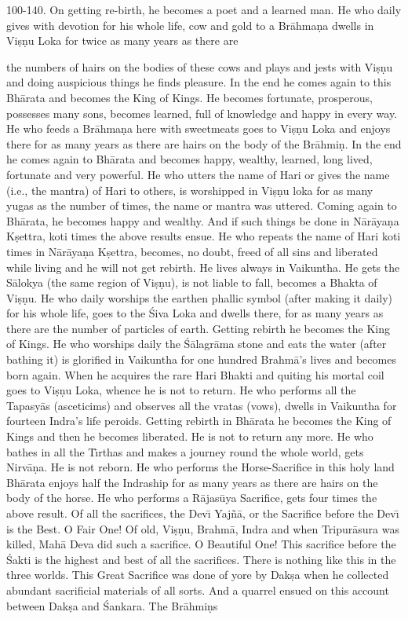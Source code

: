 100-140. On getting re-birth, he becomes a poet and a learned man. He who daily gives with devotion for his whole life, cow and gold to a Br\=ahma\d{n}a dwells in Vi\d{s}\d{n}u Loka for twice as many years as there are

the numbers of hairs on the bodies of these cows and plays and jests with Vi\d{s}\d{n}u and doing auspicious things he finds pleasure. In the end he comes again to this Bh\=arata and becomes the King of Kings. He becomes fortunate, prosperous, possesses many sons, becomes learned, full of knowledge and happy in every way. He who feeds a Br\=ahma\d{n}a here with sweetmeats goes to Vi\d{s}\d{n}u Loka and enjoys there for as many years as there are hairs on the body of the Br\=ahmi\d{n}. In the end he comes again to Bh\=arata and becomes happy, wealthy, learned, long lived, fortunate and very powerful. He who utters the name of Hari or gives the name (i.e., the mantra) of Hari to others, is worshipped in Vi\d{s}\d{n}u loka for as many yugas as the number of times, the name or mantra was uttered. Coming again to Bh\=arata, he becomes happy and wealthy. And if such things be done in N\=ar\=aya\d{n}a K\d{s}ettra, koti times the above results ensue. He who repeats the name of Hari koti times in N\=ar\=aya\d{n}a K\d{s}ettra, becomes, no doubt, freed of all sins and liberated while living and he will not get rebirth. He lives always in Vaikuntha. He gets the S\=alokya (the same region of Vi\d{s}\d{n}u), is not liable to fall, becomes a Bhakta of Vi\d{s}\d{n}u. He who daily worships the earthen phallic symbol (after making it daily) for his whole life, goes to the \'Siva Loka and dwells there, for as many years as there are the number of particles of earth. Getting rebirth he becomes the King of Kings. He who worships daily the \'S\=alagr\=ama stone and eats the water (after bathing it) is glorified in Vaikuntha for one hundred Brahm\=a's lives and becomes born again. When he acquires the rare Hari Bhakti and quiting his mortal coil goes to Vi\d{s}\d{n}u Loka, whence he is not to return. He who performs all the Tapasy\=as (asceticims) and observes all the vratas (vows), dwells in Vaikuntha for fourteen Indra's life peroids. Getting rebirth in Bh\=arata he becomes the King of Kings and then he becomes liberated. He is not to return any more. He who bathes in all the T\={\i}rthas and makes a journey round the whole world, gets Nirv\=a\d{n}a. He is not reborn. He who performs the Horse-Sacrifice in this holy land Bh\=arata enjoys half the Indraship for as many years as there are hairs on the body of the horse. He who performs a R\=ajas\=uya Sacrifice, gets four times the above result. Of all the sacrifices, the Dev\={\i} Yaj\~n\=a, or the Sacrifice before the Dev\={\i} is the Best. O Fair One! Of old, Vi\d{s}\d{n}u, Brahm\=a, Indra and when Tripur\=asura was killed, Mah\=a Deva did such a sacrifice. O Beautiful One! This sacrifice before the \'Sakti is the highest and best of all the sacrifices. There is nothing like this in the three worlds. This Great Sacrifice was done of yore by Dak\d{s}a when he collected abundant sacrificial materials of all sorts. And a quarrel ensued on this account between Dak\d{s}a and \'Sankara. The Br\=ahmi\d{n}s

